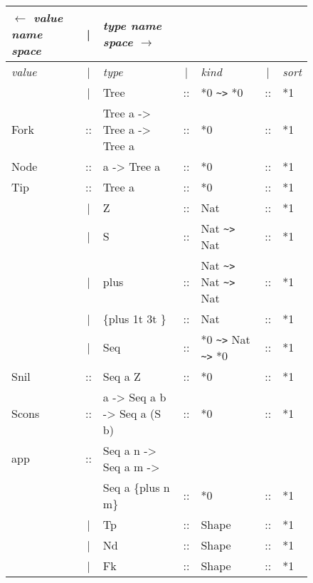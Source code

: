 \documentclass[11pt,twoside,A4]{llncs}
\begin{document}
\begin{figure}[t]
{\tt
\begin{tabular}{|lclclcl|} \hline
  $\leftarrow$     {\it {\tiny value name space}}&|& {\it {\tiny type name space $\rightarrow$}} & &  && \\ \hline
{\em value}&|& {\em type} &|&  {\em kind} &|& {\em sort} \\ \hline
     & |& Tree        &::& *0 \verb+~>+ *0 &::& *1 \\
Fork &::& Tree a -> Tree a -> Tree a &::& *0       &::& *1 \\
Node &::& a -> Tree a &::& *0       &::& *1 \\
Tip  &::&      Tree a &::& *0       &::& *1 \\ \hline
     & |& Z        &::& Nat &::& *1 \\
     & |& S        &::& Nat \verb+~>+ Nat &::& *1 \\   \hline  
     & |& plus     &::& Nat \verb+~>+ Nat \verb+~>+ Nat &::& *1 \\    
     & |& \{plus 1t 3t \} &::& Nat &::& *1 \\    \hline
     &|& Seq       &::& *0 \verb+~>+ Nat \verb+~>+ *0 &::& *1 \\ 
Snil  &::& Seq a Z &::& *0 &::& *1 \\
Scons &::& a -> Seq a b -> Seq a (S b) &::& *0 &::& *1 \\
app   &::& Seq a n -> Seq a m -> && && \\
      &  & Seq a \{plus n m\} &::&*0  &::&  *1\\   \hline  
      & |& Tp        &::& Shape &::& *1 \\     
      & |& Nd        &::& Shape &::& *1 \\     
      & |& Fk        &::& Shape &::& *1 \\   \hline       


\end{tabular}}
\end{figure}
\end{document}
